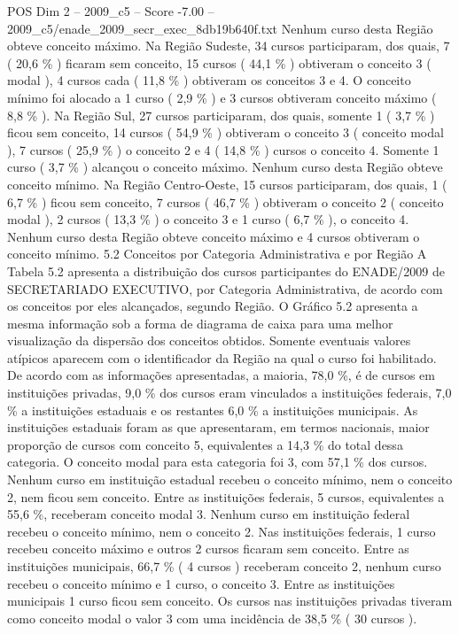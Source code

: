 \begin{textsample}{POS Dim 2 – 2009\_c5 – Score -7.00 – 2009\_c5/enade\_2009\_secr\_exec\_8db19b640f.txt}
Nenhum curso desta Região obteve conceito máximo.
Na Região Sudeste, 34 cursos participaram, dos quais, 7 ( 20,6 \% ) ficaram sem conceito, 15 cursos ( 44,1 \% ) obtiveram o conceito 3 ( modal ), 4 cursos cada ( 11,8 \% ) obtiveram os conceitos 3 e 4.
O conceito mínimo foi alocado a 1 curso ( 2,9 \% ) e 3 cursos obtiveram conceito máximo ( 8,8 \% ).
Na Região Sul, 27 cursos participaram, dos quais, somente 1 ( 3,7 \% ) ficou sem conceito, 14 cursos ( 54,9 \% ) obtiveram o conceito 3 ( conceito modal ), 7 cursos ( 25,9 \% ) o conceito 2 e 4 ( 14,8 \% ) cursos o conceito 4.
Somente 1 curso ( 3,7 \% ) alcançou o conceito máximo.
Nenhum curso desta Região obteve conceito mínimo.
Na Região Centro-Oeste, 15 cursos participaram, dos quais, 1 ( 6,7 \% ) ficou sem conceito, 7 cursos ( 46,7 \% ) obtiveram o conceito 2 ( conceito modal ), 2 cursos ( 13,3 \% ) o conceito 3 e 1 curso ( 6,7 \% ), o conceito 4.
Nenhum curso desta Região obteve conceito máximo e 4 cursos obtiveram o conceito mínimo. 5.2 Conceitos por Categoria Administrativa e por Região A Tabela 5.2 apresenta a distribuição dos cursos participantes do ENADE/2009 de SECRETARIADO EXECUTIVO, por Categoria Administrativa, de acordo com os conceitos por eles alcançados, segundo Região.
O Gráfico 5.2 apresenta a mesma informação sob a forma de diagrama de caixa para uma melhor visualização da dispersão dos conceitos obtidos.
Somente eventuais valores atípicos aparecem com o identificador da Região na qual o curso foi habilitado.
De acordo com as informações apresentadas, a maioria, 78,0 \%, é de cursos em instituições privadas, 9,0 \% dos cursos eram vinculados a instituições federais, 7,0 \% a instituições estaduais e os restantes 6,0 \% a instituições municipais.
As instituições estaduais foram as que apresentaram, em termos nacionais, maior proporção de cursos com conceito 5, equivalentes a 14,3 \% do total dessa categoria.
O conceito modal para esta categoria foi 3, com 57,1 \% dos cursos.
Nenhum curso em instituição estadual recebeu o conceito mínimo, nem o conceito 2, nem ficou sem conceito.
Entre as instituições federais, 5 cursos, equivalentes a 55,6 \%, receberam conceito modal 3.
Nenhum curso em instituição federal recebeu o conceito mínimo, nem o conceito 2.
Nas instituições federais, 1 curso recebeu conceito máximo e outros 2 cursos ficaram sem conceito.
Entre as instituições municipais, 66,7 \% ( 4 cursos ) receberam conceito 2, nenhum curso recebeu o conceito mínimo e 1 curso, o conceito 3.
Entre as instituições municipais 1 curso ficou sem conceito.
Os cursos nas instituições privadas tiveram como conceito modal o valor 3 com uma incidência de 38,5 \% ( 30 cursos ).

\end{textsample}
